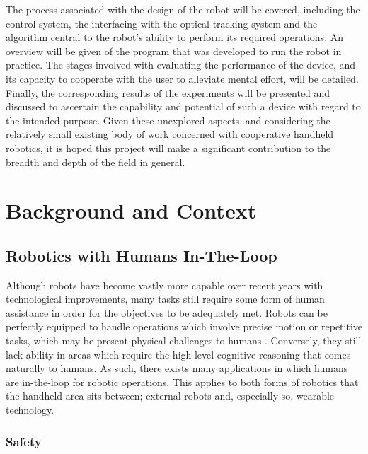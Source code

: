 \documentclass[11pt]{article}
\begin{document}
The process associated with the design of the robot will be covered, including the control system, the interfacing with the optical tracking system and the algorithm central to the robot's ability to perform its required operations. An overview will be given of the program that was developed to run the robot in practice. The stages involved with evaluating the performance of the device, and its capacity to cooperate with the user to alleviate mental effort, will be detailed. Finally, the corresponding results of the experiments will be presented and discussed to ascertain the capability and potential of such a device with regard to the intended purpose. Given these unexplored aspects, and considering the relatively small existing body of work concerned with cooperative handheld robotics, it is hoped this project will make a significant contribution to the breadth and depth of the field in general.

\pagebreak
\section{Background and Context}
\subsection{Robotics with Humans In-The-Loop} \label{intheloop}

Although robots have become vastly more capable over recent years with technological improvements, many tasks still require some form of human assistance in order for the objectives to be adequately met. Robots can be perfectly equipped to handle operations which involve precise motion or repetitive tasks, which may be present physical challenges to humans \cite{Chipalkatty2012}. Conversely, they still lack ability in areas which require the high-level cognitive reasoning that comes naturally to humans. As such, there exists many applications in which humans are in-the-loop for robotic operations. This applies to both forms of robotics that the handheld area sits between; external robots and, especially so, wearable technology.  

\subsubsection{Safety}
\end{document}
